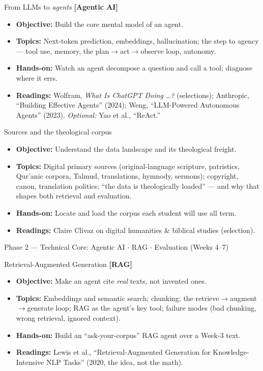 \documentclass[11pt]{article}
\newcommand{\pillar}[1]{{\small\color{accent}\textbf{[#1]}}}
\newcommand{\phase}[1]{%
  \vspace{0.8em}
  \noindent\colorbox{primary}{\parbox{\dimexpr\textwidth-2\fboxsep}{%
    \color{white}\bfseries\large\strut #1}}\par\vspace{0.5em}}
\newenvironment{week}[2]{%
  \vspace{0.4em}
  \noindent{\color{primary}\bfseries #1}\; #2\par\nobreak
  \begin{itemize}[leftmargin=1.4em,itemsep=1pt,topsep=2pt]}%
  {\end{itemize}}
\begin{document}
\begin{week}{Week 2}{From LLMs to \emph{agents} \pillar{Agentic AI}}
  \item \textbf{Objective:} Build the core mental model of an agent.
  \item \textbf{Topics:} Next-token prediction, embeddings, hallucination; the step to agency --- tool use,
    memory, the plan$\rightarrow$act$\rightarrow$observe loop, autonomy.
  \item \textbf{Hands-on:} Watch an agent decompose a question and call a tool; diagnose where it errs.
  \item \textbf{Readings:} Wolfram, \emph{What Is ChatGPT Doing \dots?} (selections); Anthropic, ``Building Effective
    Agents'' (2024); Weng, ``LLM-Powered Autonomous Agents'' (2023). \emph{Optional:} Yao et al., ``ReAct.''
\end{week}

\begin{week}{Week 3}{Sources and the theological corpus}
  \item \textbf{Objective:} Understand the data landscape and its theological freight.
  \item \textbf{Topics:} Digital primary sources (original-language scripture, patristics, Qur'anic corpora,
    Talmud, translations, hymnody, sermons); copyright, canon, translation politics; ``the data is
    theologically loaded'' --- and why that shapes both retrieval and evaluation.
  \item \textbf{Hands-on:} Locate and load the corpus each student will use all term.
  \item \textbf{Readings:} Claire Clivaz on digital humanities \& biblical studies (selection).
\end{week}

\phase{Phase 2 --- Technical Core: Agentic AI $\cdot$ RAG $\cdot$ Evaluation (Weeks 4--7)}

\begin{week}{Week 4}{Retrieval-Augmented Generation \pillar{RAG}}
  \item \textbf{Objective:} Make an agent cite \emph{real} texts, not invented ones.
  \item \textbf{Topics:} Embeddings and semantic search; chunking; the retrieve$\rightarrow$augment$\rightarrow$generate loop; RAG as
    the agent's key tool; failure modes (bad chunking, wrong retrieval, ignored context).
  \item \textbf{Hands-on:} Build an ``ask-your-corpus'' RAG agent over a Week-3 text.
  \item \textbf{Readings:} Lewis et al., ``Retrieval-Augmented Generation for Knowledge-Intensive NLP Tasks''
    (2020, the idea, not the math).
\end{week}
\end{document}
